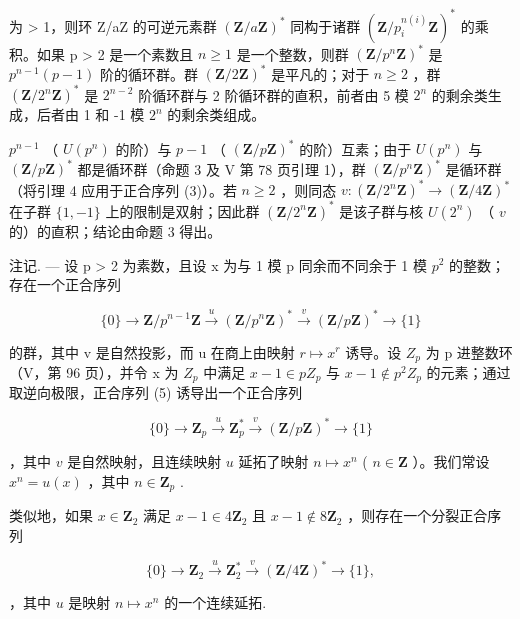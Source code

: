 为 \textgreater{} 1，则环 Z/aZ 的可逆元素群 \((\mathbf{Z}/a\mathbf{Z})^{*}\) 同构于诸群 \((\mathbf{Z}/p_{i}^{n(i)}\mathbf{Z})^{*}\) 的乘积。如果 p \textgreater{} 2 是一个素数且 \(n \geqslant 1\) 是一个整数，则群 \((\mathbf{Z}/p^{n}\mathbf{Z})^{*}\) 是 \(p^{n-1}(p - 1)\) 阶的循环群。群 \((\mathbf{Z}/2\mathbf{Z})^{*}\) 是平凡的；对于 \(n \geqslant 2\) ，群 \((\mathbf{Z}/2^{n}\mathbf{Z})^{*}\) 是 \(2^{n-2}\) 阶循环群与 2 阶循环群的直积，前者由 5 模 \(2^{n}\) 的剩余类生成，后者由 1 和 -1 模 \(2^{n}\) 的剩余类组成。

\(p^{n-1}\) （ \(U(p^n)\) 的阶）与 \(p-1\) （ \((\mathbf{Z}/p\mathbf{Z})^*\) 的阶）互素；由于 \(U(p^n)\) 与 \((\mathbf{Z}/p\mathbf{Z})^*\) 都是循环群（命题 3 及 V 第 78 页引理 1），群 \((\mathbf{Z}/p^n\mathbf{Z})^*\) 是循环群（将引理 4 应用于正合序列 (3)）。若 \(n \geqslant 2\) ，则同态 \(v: (\mathbf{Z}/2^n\mathbf{Z})^* \to (\mathbf{Z}/4\mathbf{Z})^*\) 在子群 \(\{1, -1\}\) 上的限制是双射；因此群 \((\mathbf{Z}/2^n\mathbf{Z})^*\) 是该子群与核 \(U(2^n)\) （ \(v\) 的）的直积；结论由命题 3 得出。

注记. --- 设 p \textgreater{} 2 为素数，且设 x 为与 1 模 p 同余而不同余于 1 模 \(p^{2}\) 的整数；存在一个正合序列

\[
\{0 \} \rightarrow \mathbf {Z} / p ^ {n - 1} \mathbf {Z} \xrightarrow {u} (\mathbf {Z} / p ^ {n} \mathbf {Z}) ^ {*} \xrightarrow {v} (\mathbf {Z} / p \mathbf {Z}) ^ {*} \rightarrow \{1 \}\tag{5}
\]

的群，其中 v 是自然投影，而 u 在商上由映射 \(r \mapsto x^{r}\) 诱导。设 \(Z_{p}\) 为 p 进整数环（V，第 96 页），并令 x 为 \(Z_{p}\) 中满足 \(x - 1 \in pZ_{p}\) 与 \(x - 1 \notin p^{2}Z_{p}\) 的元素；通过取逆向极限，正合序列 (5) 诱导出一个正合序列

\[
\{0 \} \rightarrow \mathbf {Z} _ {p} \stackrel {u} {\rightarrow} \mathbf {Z} _ {p} ^ {*} \stackrel {v} {\rightarrow} (\mathbf {Z} / p \mathbf {Z}) ^ {*} \rightarrow \{1 \}
\]

，其中 \(v\) 是自然映射，且连续映射 \(u\) 延拓了映射 \(n \mapsto x^n\) ( \(n \in \mathbf{Z}\) ）。我们常设 \(x^n = u(x)\) ，其中 \(n \in \mathbf{Z}_p\) .

类似地，如果 \(x \in \mathbf{Z}_2\) 满足 \(x - 1 \in 4\mathbf{Z}_2\) 且 \(x - 1 \notin 8\mathbf{Z}_2\) ，则存在一个分裂正合序列

\[
\{0 \} \rightarrow \mathbf {Z} _ {2} \stackrel {{u}} {{\rightarrow}} \mathbf {Z} _ {2} ^ {*} \stackrel {{v}} {{\rightarrow}} (\mathbf {Z} / 4 \mathbf {Z}) ^ {*} \rightarrow \{1 \},
\]

，其中 \(u\) 是映射 \(n \mapsto x^n\) 的一个连续延拓.

